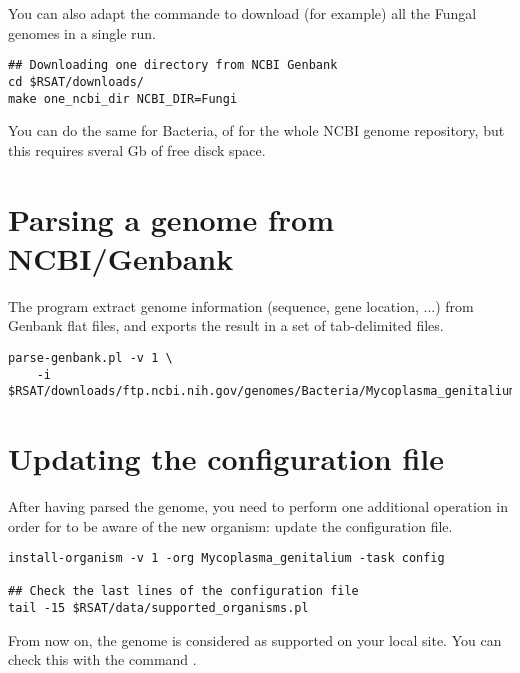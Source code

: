 You can also adapt the commande to download (for example) all the
Fungal genomes in a single run.

\begin{footnotesize}
\begin{verbatim}
## Downloading one directory from NCBI Genbank
cd $RSAT/downloads/
make one_ncbi_dir NCBI_DIR=Fungi
\end{verbatim}
\end{footnotesize}

You can do the same for Bacteria, of for the whole NCBI genome
repository, but this requires sveral Gb of free disck space.

\section{Parsing a genome from NCBI/Genbank}

The program  extract genome information
(sequence, gene location, ...) from Genbank flat files, and exports
the result in a set of tab-delimited files.

\begin{footnotesize}
\begin{verbatim}
parse-genbank.pl -v 1 \
    -i $RSAT/downloads/ftp.ncbi.nih.gov/genomes/Bacteria/Mycoplasma_genitalium 
\end{verbatim}
\end{footnotesize}

\section{Updating the configuration file}

After having parsed the genome, you need to perform one additional
operation in order for \RSAT to be aware of the new organism: update
the configuration file.

\begin{footnotesize}
\begin{verbatim}
install-organism -v 1 -org Mycoplasma_genitalium -task config

## Check the last lines of the configuration file
tail -15 $RSAT/data/supported_organisms.pl
\end{verbatim}
\end{footnotesize}

From now on, the genome is considered as supported on your local \RSAT
site. You can check this with the command \program{supported-organisms}. 

